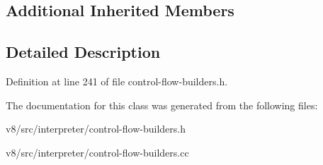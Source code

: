 \subsection*{Additional Inherited Members}


\subsection{Detailed Description}


Definition at line 241 of file control-\/flow-\/builders.\+h.



The documentation for this class was generated from the following files\+:\begin{DoxyCompactItemize}
\item 
v8/src/interpreter/control-\/flow-\/builders.\+h\item 
v8/src/interpreter/control-\/flow-\/builders.\+cc\end{DoxyCompactItemize}
